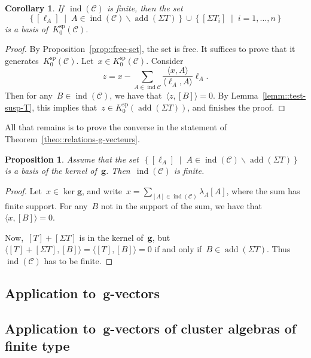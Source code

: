 \documentclass{amsart}
\newtheorem{corollary}[theorem]{Corollary}
\newtheorem{proposition}[theorem]{Proposition}
\theoremstyle{definition}
\renewcommand{\b}[1]{{\boldsymbol{#1}}} %
\newcommand{\set}[2]{\left\{ #1 \;\middle|\; #2 \right\}} %
\newcommand{\ssm}{\smallsetminus} %
\newcommand{\cat}{\mathcal{C}}
\newcommand{\susp}{\Sigma}
\newcommand{\add}{\operatorname{add}}
\newcommand{\spl}{\operatorname{sp}}
\newcommand{\Ksp}{K_0^{\spl}}
\newcommand{\ind}{\operatorname{ind}}
\begin{document}
\begin{corollary}
 If~$\ind(\cat)$ is finite, then the set
 \[
 \set{[\ell_A]}{A\in \ind(\cat) \ssm \add(\susp T)} \cup \set{[\susp T_i]}{i=1, \ldots, n}
 \]
 is a basis of~$\Ksp(\cat)$.
\end{corollary}
\begin{proof}
 By Proposition~\ref{prop::free-set}, the set is free.  It suffices to prove that it generates~$\Ksp(\cat)$.  Let~$x\in \Ksp(\cat)$.  Consider
 \[
  z = x - \sum_{A\in \ind{\cat}} \frac{\langle x, A \rangle}{\langle \ell_A, A\rangle} \ell_A.
 \]
 Then for any~$B\in \ind(\cat)$, we have that~$\langle z, [B] \rangle = 0$.  By Lemma~\ref{lemm::test-susp-T}, this implies that~$z\in \Ksp(\add(\susp T))$, and finishes the proof.
\end{proof}


All that remains is to prove the converse in the statement of Theorem~\ref{theo::relations-g-vecteurs}.

\begin{proposition}
 Assume that the set~$\set{[\ell_A]}{A\in \ind(\cat) \ssm \add(\susp T)}$ is a basis of the kernel of~$\b g$. Then~$\ind(\cat)$ is finite.
\end{proposition}
\begin{proof}
 Let~$x\in \ker \b g$, and write~$x = \sum_{[A]\in \ind(\cat)} \lambda_A[A]$, where the sum has finite support.  For any~$B$ not in the support of the sum, we have that~$\langle x, [B] \rangle = 0$.
 
 Now,~$[T]+[\susp T]$ is in the kernel of~$\b g$, but~$\langle [T] + [\susp T], [B] \rangle = \langle [T], [B] \rangle = 0$ if and only if~$B\in \add(\susp T)$.  Thus~$\ind(\cat)$ has to be finite.
\end{proof}


\subsection{Application to~$\b g$-vectors}\label{sect::applications-g-vectors}

\subsection{Application to~$\b g$-vectors of cluster algebras of finite type}\label{sect::applications-g-vectors}
\end{document}
